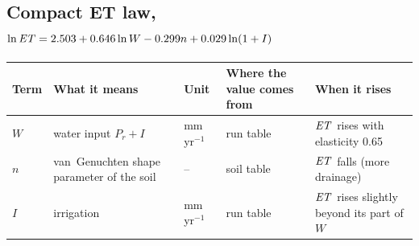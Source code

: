 \subsection*{Compact ET law, $\ln\mathit{ET}=2.503+0.646\ln W-0.299n+0.029\ln(1+I)$}
{\small\begin{longtable}{>{\raggedright\arraybackslash}p{}>{\raggedright\arraybackslash}p{}>{\raggedright\arraybackslash}p{}>{\raggedright\arraybackslash}p{}>{\raggedright\arraybackslash}p{}}\toprule Term & What it means & Unit & Where the value comes from & When it rises\\\midrule\endhead
$W$ & water input $P_r+I$ & mm\,yr$^{-1}$ & run table & $\mathit{ET}$ rises with elasticity 0.65\\
$n$ & van~Genuchten shape parameter of the soil & -- & soil table & $\mathit{ET}$ falls (more drainage)\\
$I$ & irrigation & mm\,yr$^{-1}$ & run table & $\mathit{ET}$ rises slightly beyond its part of $W$\\
\bottomrule\end{longtable}}
